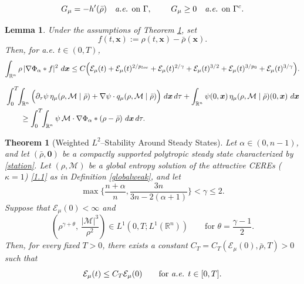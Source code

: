 \documentclass[10pt,a4paper]{amsart}
\newtheorem{theorem}{Theorem}
\newtheorem{lemma}{Lemma}
\def\dd{{\, \rm d}}
\begin{document}
\begin{equation}\label{property}
G_\mu=-h'(\bar\rho)\quad\hbox{{\it a.e. }on } \Gamma, \qquad\,\, G_\mu\ge0\quad\hbox{{\it a.e. }on }\Gamma^{\rm c}.
\end{equation}

\begin{lemma}\label{relativenonlocal}
Under the assumptions of {\rm Theorem \ref{thm:stability}}, set
\[
f(t,\boldsymbol{x}):=\rho(t,\boldsymbol{x})-\bar\rho(\boldsymbol{x}).
\]
Then, for {\it a.e.} $t\in(0,T)$,
\begin{equation}\label{relativeestimate}
\int_{\mathbb R^n}\rho\,|\nabla\Phi_\alpha*f|^2\,\dd\boldsymbol{x}
 \le C\Big( \mathcal E_\mu(t) +\mathcal E_\mu(t)^{2/p_{\rm loc}} +\mathcal E_\mu(t)^{2/\gamma} +\mathcal E_\mu(t)^{3/2}+\mathcal E_\mu(t)^{3/p_0}  +\mathcal E_\mu(t)^{3/\gamma}  \Big).
\end{equation}
\end{lemma}

\begin{align}\label{testinequality}
&\int_0^T\!\!\int_{\mathbb R^n}
\Big(\partial_\tau\psi\,\eta_\mu(\rho,\mathcal M\mid\bar\rho)
+\nabla\psi\cdot q_\mu(\rho,\mathcal M\mid\bar\rho)\Big)\,\dd\boldsymbol{x}\dd\tau
+\int_{\mathbb R^n}\psi(0,\boldsymbol{x})\,\eta_\mu(\rho,\mathcal M\mid\bar\rho)(0,\boldsymbol{x})\,\dd\boldsymbol{x}
\nonumber\\
&\qquad\ge
\int_0^T\!\!\int_{\mathbb R^n}
\psi\,\mathcal M\cdot\nabla\Phi_\alpha*(\rho-\bar\rho)\,\dd\boldsymbol{x}\dd\tau.
\end{align}

\begin{theorem}[Weighted $L^2$--Stability Around Steady States]\label{thm:stability}
Let $\alpha\in(0,n-1)$, and let $(\bar\rho,\boldsymbol{0})$ be a compactly supported polytropic steady state characterized by \eqref{station}.
Let $(\rho,\mathcal M)$ be a global entropy solution of 
the attractive CEREs {\rm(}$\kappa=1${\rm)} \eqref{1.1} as in
{\rm Definition \ref{globalweak}}, and let
\[
\max \Big\{\frac{n + \alpha}{n},\frac{3n}{3n - 2(\alpha + 1)} \Big\}<\gamma\le2.
\]
Suppose that $\mathcal E_\mu(0)<\infty$ and
\[
(\rho^{\gamma + \theta}, \,\frac{|\mathcal{M}|^{3}}{\rho^{2}})
\in L^1(0,T;L^1(\mathbb{R}^n))
\qquad \mbox{for $\theta = \frac{\gamma - 1}{2}$}.
\]
Then, for every fixed $T>0$, there exists a constant
$C_T=C_T(\mathcal E_\mu(0),\bar{\rho},T)>0$ such that
\begin{equation}\label{finitetimerelative}
 \mathcal E_\mu(t)
 \le C_T\mathcal E_\mu(0)
 \qquad \hbox{for {\it a.e.} }t\in[0,T].
\end{equation}
\end{theorem}
\end{document}
